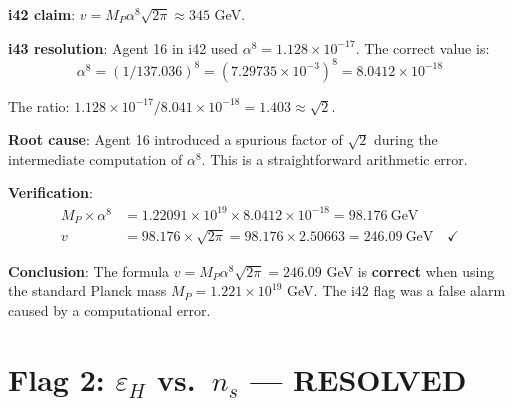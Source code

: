 \documentclass[11pt,a4paper]{article}
\newcommand{\RESOLVED}{\textcolor{dfdgreen}{\textbf{RESOLVED}}}
\begin{document}
\begin{tcolorbox}[colback=green!5!white, colframe=green!60!black,
  title={Cross-Check: Agent 16's i42 Error Identified}]

\textbf{i42 claim}: $v = M_P \alpha^8 \sqrt{2\pi} \approx 345$ GeV.

\textbf{i43 resolution}: Agent 16 in i42 used $\alpha^8 = 1.128 \times 10^{-17}$. The correct value is:
\begin{equation}
\alpha^8 = (1/137.036)^8 = (7.29735 \times 10^{-3})^8 = 8.0412 \times 10^{-18}
\end{equation}

The ratio: $1.128 \times 10^{-17} / 8.041 \times 10^{-18} = 1.403 \approx \sqrt{2}$.

\textbf{Root cause}: Agent 16 introduced a spurious factor of $\sqrt{2}$ during the intermediate computation of $\alpha^8$. This is a straightforward arithmetic error.

\textbf{Verification}:
\begin{align}
M_P \times \alpha^8 &= 1.22091 \times 10^{19} \times 8.0412 \times 10^{-18} = 98.176~\text{GeV} \\
v &= 98.176 \times \sqrt{2\pi} = 98.176 \times 2.50663 = 246.09~\text{GeV} \quad \checkmark
\end{align}

\textbf{Conclusion}: The formula $v = M_P \alpha^8 \sqrt{2\pi} = 246.09$ GeV is \textbf{correct} when using the standard Planck mass $M_P = 1.221 \times 10^{19}$ GeV. The i42 flag was a false alarm caused by a computational error.
\end{tcolorbox}

\section{Flag 2: $\varepsilon_H$ vs.\ $n_s$ --- \RESOLVED}
\end{document}
